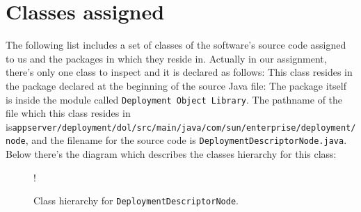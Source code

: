 \break
\section{Classes assigned}
The following list includes a set of classes of the software's source code assigned to us and the packages in which they reside in.
Actually in our assignment, there's only one class to inspect and it is declared as follows:
This class resides in the package declared at the beginning of the source Java file:
The package itself is inside the module called \texttt{Deployment Object Library}. \newline
The pathname of the file which this class resides in is\newline \texttt{appserver/deployment/dol/src/main/java/com/sun/enterprise/deployment/node}, and the filename for the source code is \texttt{DeploymentDescriptorNode.java}.
Below there's the diagram which describes the classes hierarchy for this class:
\begin{figure}[H]
	\centering
	\resizebox{2.5in}
	{!}{}
	\caption{Class hierarchy for \texttt{DeploymentDescriptorNode}.}
\end{figure}